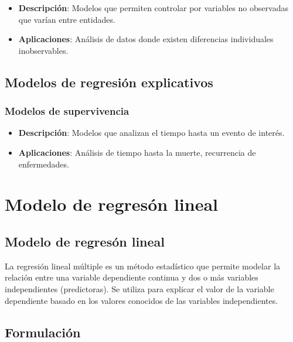 \documentclass[
  letterpaper,
  DIV=11,
  numbers=noendperiod]{scrreprt}
\providecommand{\tightlist}{%
  \setlength{\itemsep}{0pt}\setlength{\parskip}{0pt}}\usepackage{longtable,booktabs,array}
\begin{document}
\begin{itemize}
\tightlist
\item
  \textbf{Descripción}: Modelos que permiten controlar por variables no
  observadas que varían entre entidades.
\item
  \textbf{Aplicaciones}: Análisis de datos donde existen diferencias
  individuales inobservables.
\end{itemize}

\section{Modelos de regresión
explicativos}\label{modelos-de-regresiuxf3n-explicativos-4}

\subsection{Modelos de supervivencia}\label{modelos-de-supervivencia}

\begin{itemize}
\tightlist
\item
  \textbf{Descripción}: Modelos que analizan el tiempo hasta un evento
  de interés.
\item
  \textbf{Aplicaciones}: Análisis de tiempo hasta la muerte, recurrencia
  de enfermedades.
\end{itemize}


\chapter{Modelo de regresón lineal}\label{modelo-de-regresuxf3n-lineal}

\section{Modelo de regresón
lineal}\label{modelo-de-regresuxf3n-lineal-1}

La regresión lineal múltiple es un método estadístico que permite
modelar la relación entre una variable dependiente continua y dos o más
variables independientes (predictoras). Se utiliza para explicar el
valor de la variable dependiente basado en los valores conocidos de las
variables independientes.

\section{Formulación}\label{formulaciuxf3n-3}
\end{document}
